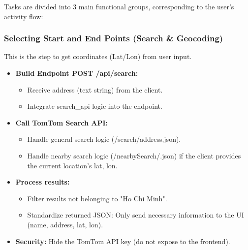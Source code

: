       
Tasks are divided into 3 main functional groups, corresponding to the user's activity flow:
\subsubsection{Selecting Start and End Points (Search \& Geocoding)}
This is the step to get coordinates (Lat/Lon) from user input.
\begin{itemize}
    \item \textbf{Build Endpoint POST /api/search:}
    \begin{itemize}
        \item Receive address (text string) from the client.
        \item Integrate search\_api logic into the endpoint.
    \end{itemize}
    \item \textbf{Call TomTom Search API:}
    \begin{itemize}
        \item Handle general search logic (/search/{address}.json).
        \item Handle nearby search logic (/nearbySearch/.json) if the client provides the current location's lat, lon.
    \end{itemize}
    \item \textbf{Process results:}
    \begin{itemize}
        \item Filter results not belonging to "Ho Chi Minh".
        \item Standardize returned JSON: Only send necessary information to the UI (name, address, lat, lon).
    \end{itemize}
    \item \textbf{Security:} Hide the TomTom API key (do not expose to the frontend).
\end{itemize}

